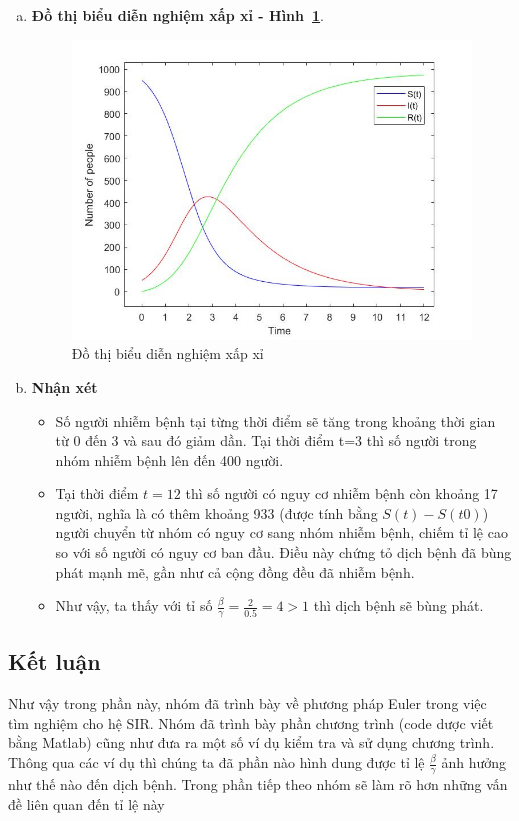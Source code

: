 \begin{enumerate}[a)]
\item \textbf{Đồ thị biểu diễn nghiệm xấp xỉ - Hình~\ref{Fig:vd2}}.
	\begin{figure}[h!]
		\begin{center}
		\includegraphics[scale=0.5]{Images/baitoan2/p2.jpg}
		\end{center}
		\caption{Đồ thị biểu diễn nghiệm xấp xỉ }\label{Fig:vd2}
	\end{figure}

\item \textbf{Nhận xét}
	\begin{itemize}
		\item Số người nhiễm bệnh tại từng thời điểm sẽ tăng trong khoảng thời gian từ 0 đến 3 và sau đó giảm dần. Tại thời điểm t=3 thì số người trong nhóm nhiễm bệnh lên đến 400 người.
		\item Tại thời điểm $ t = 12 $ thì số người có nguy cơ nhiễm bệnh còn khoảng 17 người, nghĩa là có thêm khoảng 933 (được tính bằng $ S(t)-S(t0) $) người chuyển từ nhóm có nguy cơ sang nhóm nhiễm bệnh, chiếm tỉ lệ cao so với số người có nguy cơ ban đầu. Điều này chứng tỏ dịch bệnh đã bùng phát mạnh mẽ, gần như cả cộng đồng đều đã nhiễm bệnh.
		\item Như vậy, ta thấy với  tỉ số $ \frac{\beta}{\gamma} = \frac{2}{0.5} = 4 > 1$ thì dịch bệnh sẽ  bùng phát. 
	\end{itemize}
\end{enumerate}

\subsection{Kết luận}
Như vậy trong phần này, nhóm đã trình bày về phương pháp Euler trong việc tìm nghiệm cho hệ SIR. Nhóm đã trình bày phần chương trình (code dược viết bằng Matlab) cũng như đưa ra một số ví dụ kiểm tra và sử dụng chương trình. Thông qua các ví dụ thì chúng ta đã phần nào hình dung được tỉ lệ $ \frac{\beta}{\gamma} $ ảnh hưởng như thế nào đến dịch bệnh. Trong phần tiếp theo nhóm sẽ làm rõ hơn những vấn đề liên quan đến tỉ lệ này
